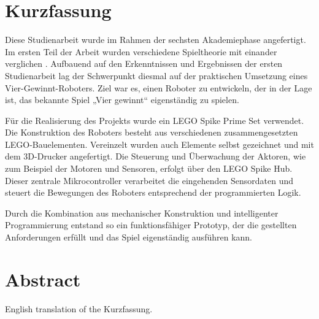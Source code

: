 \chapter*{Kurzfassung} %

%
%
%
 

Diese Studienarbeit wurde im Rahmen der sechsten Akademiephase angefertigt. Im ersten Teil der Arbeit wurden verschiedene Spieltheorie mit einander verglichen  .
Aufbauend auf den Erkenntnissen und Ergebnissen der ersten Studienarbeit lag der Schwerpunkt diesmal auf der praktischen Umsetzung eines Vier-Gewinnt-Roboters. Ziel war es, einen Roboter zu entwickeln, der in der Lage ist, das bekannte Spiel „Vier gewinnt“ eigenständig zu spielen.

Für die Realisierung des Projekts wurde ein LEGO Spike Prime Set verwendet. Die Konstruktion des Roboters besteht aus verschiedenen zusammengesetzten LEGO-Bauelementen. Vereinzelt wurden auch Elemente selbst gezeichnet und mit dem 3D-Drucker angefertigt.  
Die Steuerung und Überwachung der Aktoren, wie zum Beispiel der Motoren und Sensoren, erfolgt über den LEGO Spike Hub. Dieser zentrale Mikrocontroller verarbeitet die eingehenden Sensordaten und steuert die Bewegungen des Roboters entsprechend der programmierten Logik.

Durch die Kombination aus mechanischer Konstruktion und intelligenter Programmierung entstand so ein funktionsfähiger Prototyp, der die gestellten Anforderungen erfüllt und das Spiel eigenständig ausführen kann.

\clearpage

\chapter*{Abstract} %

English translation of the \glqq Kurzfassung\grqq.

\clearpage